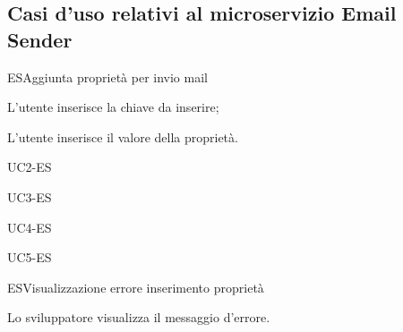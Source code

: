 \subsection{Casi d'uso relativi al microservizio Email Sender}

\begin{usecase}{1}{ES}{Aggiunta proprietà per invio mail}
	
	
	
	\begin{ucscenarioprincipale}
		\item L'utente inserisce la chiave da inserire;
		\item L'utente inserisce il valore della proprietà.
	\end{ucscenarioprincipale}

	
	\begin{ucestensioni}
		\item UC2-ES
	\end{ucestensioni}

	\begin{ucgeneralizzazioni}
		\item UC3-ES
		\item UC4-ES
		\item UC5-ES
	\end{ucgeneralizzazioni}

	\label{uc:aggiunta-proprieta-es}
\end{usecase}

\begin{usecase}{2}{ES}{Visualizzazione errore inserimento proprietà}
	
	
	
	\begin{ucscenarioprincipale}
		\item Lo sviluppatore visualizza il messaggio d'errore.
	\end{ucscenarioprincipale}
	
	
	\label{uc:vis-errore-ins-proprieta-es}
\end{usecase}

